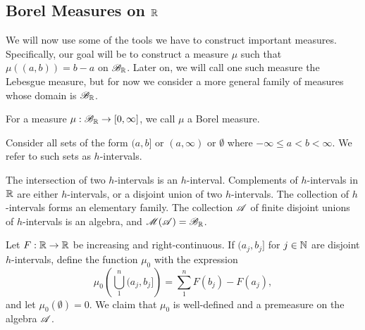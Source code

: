\documentclass[12pt]{article} %
\begin{document}
\subsection{Borel Measures on $\mathbb{R}$}

We will now use some of the tools we have to construct important measures. Specifically, our goal will be to construct a measure $\mu$ such that $\mu((a, b)) = b - a$ on $\mathscr{B}_{\mathbb{R}}$. Later on, we will call one such measure the Lebesgue measure, but for now we consider a more general family of measures whose domain is $\mathscr{B}_{\mathbb{R}}$.


\begin{definition}
    For a measure $\mu : \mathscr{B}_{\mathbb{R}} \to [0,\infty]$, we call $\mu$ a Borel measure.
\end{definition}

\begin{definition}[$h$-interval]
    Consider all sets of the form $(a, b]$ or $(a, \infty)$ or $\emptyset$ where $-\infty \leq a < b < \infty$. We refer to such sets as $h$-intervals.
\end{definition}

\begin{remark}
    The intersection of two $h$-intervals is an $h$-interval. Complements of $h$-intervals in $\mathbb{R}$ are either $h$-intervals, or a disjoint union of two $h$-intervals. The collection of $h$-intervals forms an elementary family. The collection $\mathscr{A}$ of finite disjoint unions of $h$-intervals is an algebra, and $\mathscr{M}(\mathscr{A}) = \mathscr{B}_{\mathbb{R}}$.
\end{remark}

\begin{proposition}
    Let $F : \mathbb{R} \to \mathbb{R}$ be increasing and right-continuous. If $(a_j, b_j]$ for $j \in \mathbb{N}$ are disjoint $h$-intervals, define the function $\mu_0$ with the expression \[\mu_0 \left(\bigcup_1^n (a_j, b_j] \right) = \sum_{1}^{n} F(b_j) - F(a_j),\] and let $\mu_0(\emptyset) = 0$. We claim that $\mu_0$ is well-defined and a premeasure on the algebra $\mathscr{A}$.
\end{proposition}
\end{document}
